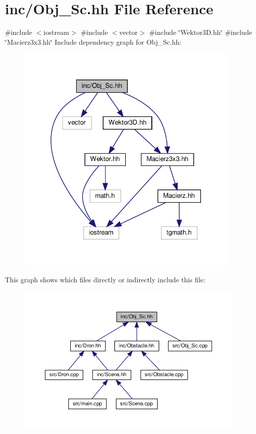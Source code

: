 \hypertarget{_obj___sc_8hh}{}\section{inc/\+Obj\+\_\+\+Sc.hh File Reference}
\label{_obj___sc_8hh}
{\ttfamily \#include $<$iostream$>$}\newline
{\ttfamily \#include $<$vector$>$}\newline
{\ttfamily \#include \char`\"{}Wektor3\+D.\+hh\char`\"{}}\newline
{\ttfamily \#include \char`\"{}Macierz3x3.\+hh\char`\"{}}\newline
Include dependency graph for Obj\+\_\+\+Sc.\+hh\+:
\nopagebreak
\begin{figure}[H]
\begin{center}
\leavevmode
\includegraphics[width=309pt]{_obj___sc_8hh__incl}
\end{center}
\end{figure}
This graph shows which files directly or indirectly include this file\+:
\nopagebreak
\begin{figure}[H]
\begin{center}
\leavevmode
\includegraphics[width=350pt]{_obj___sc_8hh__dep__incl}
\end{center}
\end{figure}
